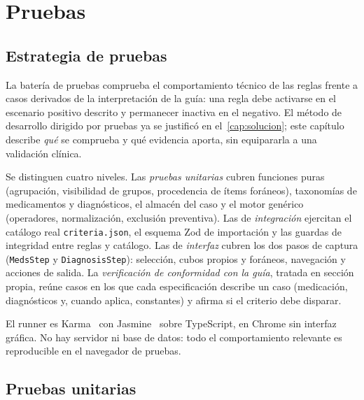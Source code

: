 
\chapter{Pruebas}
\label{cap:pruebas}

\section{Estrategia de pruebas}
\label{sec:estrategia-pruebas}

La batería de pruebas comprueba el comportamiento técnico de las reglas frente
a casos derivados de la interpretación de la guía: una regla debe activarse en
el escenario positivo descrito y permanecer inactiva en el negativo.
El método de desarrollo dirigido por pruebas ya se justificó en
el~\cref{cap:solucion}; este capítulo describe \emph{qué} se comprueba y
qué evidencia aporta, sin equipararla a una validación clínica.

Se distinguen cuatro niveles. Las \emph{pruebas unitarias} cubren funciones
puras (agrupación, visibilidad de grupos, procedencia de ítems foráneos),
taxonomías de medicamentos y diagnósticos, el almacén del caso y el motor
genérico (operadores, normalización, exclusión preventiva). Las de
\emph{integración} ejercitan el catálogo real \texttt{criteria.json}, el
esquema Zod de importación y las guardas de integridad entre reglas y
catálogo. Las de \emph{interfaz} cubren los dos pasos de captura
(\texttt{MedsStep} y \texttt{DiagnosisStep}): selección, cubos propios y
foráneos, navegación y acciones de salida. La \emph{verificación de
conformidad con la guía}, tratada en sección propia, reúne casos en los que
cada especificación
describe un caso (medicación, diagnósticos y, cuando aplica, constantes)
y afirma si el criterio debe disparar.

El runner es Karma~\cite{karma} con Jasmine~\cite{jasmine} sobre
TypeScript, en Chrome sin interfaz gráfica. No hay servidor ni base de
datos: todo el comportamiento relevante es reproducible en el navegador
de pruebas.

\section{Pruebas unitarias}


